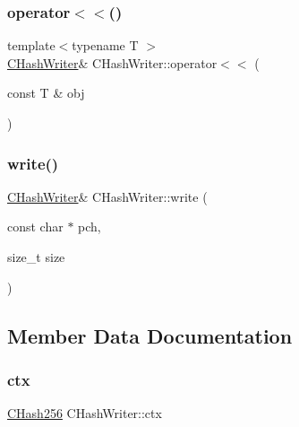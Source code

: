 \subsubsection{\texorpdfstring{operator$<$$<$()}{operator<<()}}
{\footnotesize\ttfamily template$<$typename T $>$ \\
\mbox{\hyperlink{class_c_hash_writer}{C\+Hash\+Writer}}\& C\+Hash\+Writer\+::operator$<$$<$ (\begin{DoxyParamCaption}\item[{const T \&}]{obj }\end{DoxyParamCaption})\hspace{0.3cm}{\ttfamily [inline]}}

\mbox{\label{class_c_hash_writer_a779360281eeeb4cc7485c8acae649bc9}} 
\subsubsection{\texorpdfstring{write()}{write()}}
{\footnotesize\ttfamily \mbox{\hyperlink{class_c_hash_writer}{C\+Hash\+Writer}}\& C\+Hash\+Writer\+::write (\begin{DoxyParamCaption}\item[{const char $\ast$}]{pch,  }\item[{size\+\_\+t}]{size }\end{DoxyParamCaption})\hspace{0.3cm}{\ttfamily [inline]}}



\subsection{Member Data Documentation}
\mbox{\label{class_c_hash_writer_aafd99704f526fce95d0f39714a081b54}} 
\subsubsection{\texorpdfstring{ctx}{ctx}}
{\footnotesize\ttfamily \mbox{\hyperlink{class_c_hash256}{C\+Hash256}} C\+Hash\+Writer\+::ctx\hspace{0.3cm}{\ttfamily [private]}}

\mbox{\label{class_c_hash_writer_ae8fe02b05db26a2647a7aeee035f022f}} 

